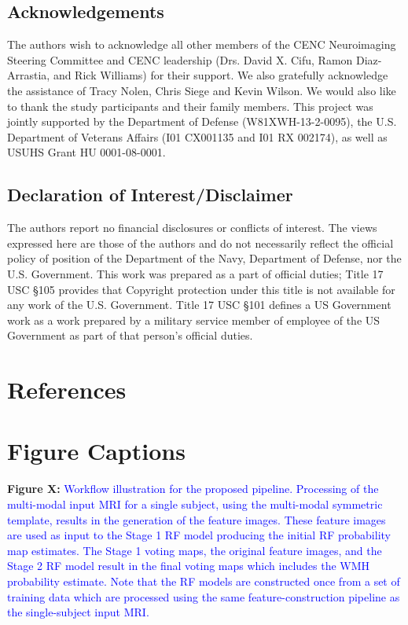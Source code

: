 \documentclass[11pt,]{article}
\begin{document}
\clearpage

\subsection{Acknowledgements}\label{acknowledgements}

The authors wish to acknowledge all other members of the CENC
Neuroimaging Steering Committee and CENC leadership (Drs. David X. Cifu,
Ramon Diaz-Arrastia, and Rick Williams) for their support. We also
gratefully acknowledge the assistance of Tracy Nolen, Chris Siege and
Kevin Wilson. We would also like to thank the study participants and
their family members. This project was jointly supported by the
Department of Defense (W81XWH-13-2-0095), the U.S. Department of
Veterans Affairs (I01 CX001135 and I01 RX 002174), as well as USUHS
Grant HU 0001-08-0001.

\subsection{Declaration of
Interest/Disclaimer}\label{declaration-of-interestdisclaimer}

The authors report no financial disclosures or conflicts of interest.
The views expressed here are those of the authors and do not necessarily
reflect the official policy of position of the Department of the Navy,
Department of Defense, nor the U.S. Government. This work was prepared
as a part of official duties; Title 17 USC §105 provides that Copyright
protection under this title is not available for any work of the U.S.
Government. Title 17 USC §101 defines a US Government work as a work
prepared by a military service member of employee of the US Government
as part of that person's official duties.

\clearpage

\section{References}\label{references}

\section{Figure Captions}\label{figure-captions}

\textbf{Figure X:}
\textcolor{blue}{Workflow illustration for the proposed pipeline.  Processing of the multi-modal
input MRI for a single subject, using the multi-modal symmetric template, results in
the generation of the feature images.  These feature images are used as input to the
Stage 1 RF model producing the initial RF probability map estimates.  The Stage 1
voting maps, the original feature images, and the Stage 2 RF model result in the
final voting maps which includes the WMH probability estimate.  Note that the RF models
are constructed once from a set of training data which are processed using the
same feature-construction pipeline as the single-subject input MRI.}
\end{document}

